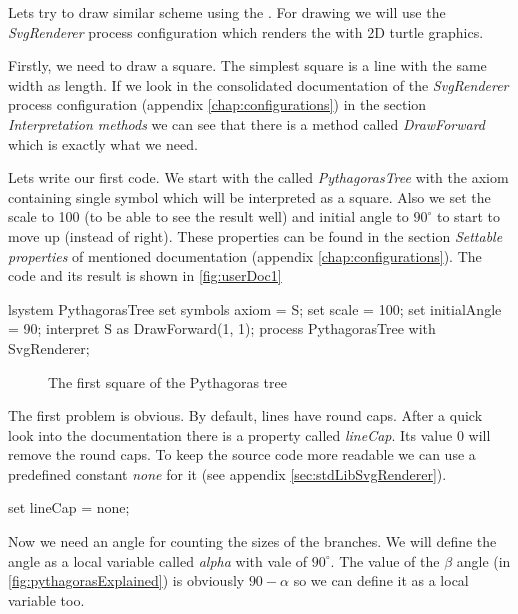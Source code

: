 Lets try to draw similar scheme using the \lsystem.
For drawing we will use the \emph{SvgRenderer} process configuration which renders the \lsystems with 2D turtle graphics.

Firstly, we need to draw a square.
The simplest square is a line with the same width as length.
If we look in the consolidated documentation of the \emph{SvgRenderer} process configuration (appendix \ref{chap:configurations}) in the section \emph{Interpretation methods} we can see that there is a method called \emph{DrawForward} which is exactly what we need.

Lets write our first code.
We start with the \lsystem called \emph{PythagorasTree} with the axiom containing single symbol which will be interpreted as a square.
Also we set the scale to 100 (to be able to see the result well) and initial angle to $90^{\circ}$ to start to move up (instead of right).
These properties can be found in the section \emph{Settable properties} of mentioned documentation (appendix \ref{chap:configurations}).
The code and its result is shown in \autoref{fig:userDoc1}

\newsavebox{\lstBoxUserDocA}
\begin{lrbox}{\lstBoxUserDocA}
\begin{Lsystem60}
lsystem PythagorasTree {
	set symbols axiom = S;
	set scale = 100;
	set initialAngle = 90;
	interpret S as DrawForward(1, 1);
}
process PythagorasTree with SvgRenderer;
\end{Lsystem60}
\end{lrbox}

\begin{figure}[h!]
	\subfloat{
		\usebox{\lstBoxUserDocA}
	} \hfill
	\caption{The first square of the Pythagoras tree}
	\label{fig:userDoc1}
\end{figure}

The first problem is obvious.
By default, lines have round caps.
After a quick look into the documentation there is a property called \emph{lineCap}.
Its value 0 will remove the round caps.
To keep the source code more readable we can use a predefined constant \emph{none} for it (see appendix \ref{sec:stdLibSvgRenderer}).

\begin{Lsystem}
set lineCap = none;
\end{Lsystem}

Now we need an angle for counting the sizes of the branches.
We will define the angle as a local variable called \emph{alpha} with vale of $90^{\circ}$.
The value of the $\beta$ angle (in \autoref{fig:pythagorasExplained}) is obviously $90 - \alpha$ so we can define it as a local variable too.


